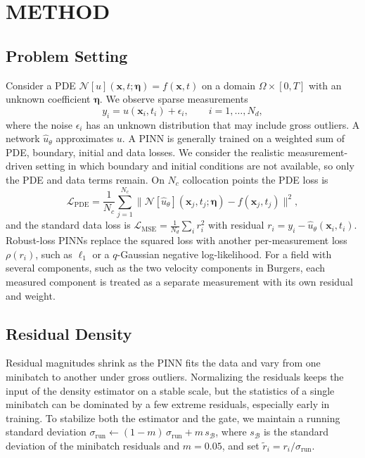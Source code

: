 \documentclass[twoside]{article}
\newcommand{\sigrun}{\sigma_{\mathrm{run}}}
\begin{document}
\section{METHOD}
\label{sec:method}

\subsection{Problem Setting}
Consider a PDE $\mathcal{N}[u](\mathbf{x},t;\boldsymbol{\eta}) = f(\mathbf{x},t)$
on a domain $\Omega \times [0,T]$ with an unknown coefficient $\boldsymbol{\eta}$.
We observe sparse measurements
\begin{equation}
y_i = u(\mathbf{x}_i, t_i) + \epsilon_i, \qquad i = 1,\dots,N_d,
\label{eq:measure}
\end{equation}
where the noise $\epsilon_i$ has an unknown distribution that may include gross
outliers. A network $\hat u_\theta$ approximates $u$. A PINN is generally trained
on a weighted sum of PDE, boundary, initial and data losses. We consider the realistic
measurement-driven setting in which boundary and initial conditions are not
available, so only the PDE and data terms remain. On $N_c$ collocation points
the PDE loss is
\begin{equation}
\mathcal{L}_{\mathrm{PDE}} = \frac{1}{N_c}\sum_{j=1}^{N_c}
\big\| \mathcal{N}[\hat u_\theta](\mathbf{x}_j,t_j;\boldsymbol{\eta})
- f(\mathbf{x}_j,t_j) \big\|^2 ,
\label{eq:pde}
\end{equation}
and the standard data loss is
$\mathcal{L}_{\mathrm{MSE}} = \frac{1}{N_d}\sum_i r_i^2$ with residual
$r_i = y_i - \hat u_\theta(\mathbf{x}_i, t_i)$. Robust-loss PINNs replace the
squared loss with another per-measurement loss $\rho(r_i)$, such as $\ell_1$ or a
$q$-Gaussian negative log-likelihood. For a field with several components, such
as the two velocity components in Burgers, each measured component is treated
as a separate measurement with its own residual and weight.

\subsection{Residual Density}
Residual magnitudes shrink as the PINN fits the data and vary from one
minibatch to another under gross outliers. Normalizing the residuals keeps the
input of the density estimator on a stable scale, but the statistics of a
single minibatch can be dominated by a few extreme residuals, especially early
in training. To stabilize both the estimator and the gate, we maintain a running
standard deviation $\sigrun \leftarrow (1-m)\,\sigrun + m\, s_{\mathcal{B}}$,
where $s_{\mathcal{B}}$ is the standard deviation of the minibatch residuals and
$m = 0.05$, and set $\tilde r_i = r_i/\sigrun$.
\end{document}
